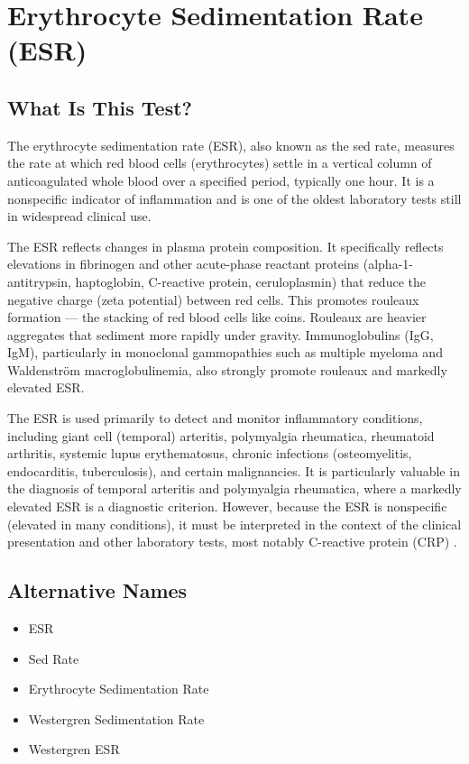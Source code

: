 \chapter{Erythrocyte Sedimentation Rate (ESR)}

\section*{What Is This Test?}
The erythrocyte sedimentation rate (ESR), also known as the sed rate, measures the rate at which red blood cells (erythrocytes) settle in a vertical column of anticoagulated whole blood over a specified period, typically one hour. It is a nonspecific indicator of inflammation and is one of the oldest laboratory tests still in widespread clinical use.

The ESR reflects changes in plasma protein composition. It specifically reflects elevations in fibrinogen and other acute-phase reactant proteins (alpha-1-antitrypsin, haptoglobin, C-reactive protein, ceruloplasmin) that reduce the negative charge (zeta potential) between red cells. This promotes rouleaux formation --- the stacking of red blood cells like coins. Rouleaux are heavier aggregates that sediment more rapidly under gravity. Immunoglobulins (IgG, IgM), particularly in monoclonal gammopathies such as multiple myeloma and Waldenstr\"{o}m macroglobulinemia, also strongly promote rouleaux and markedly elevated ESR.

The ESR is used primarily to detect and monitor inflammatory conditions, including giant cell (temporal) arteritis, polymyalgia rheumatica, rheumatoid arthritis, systemic lupus erythematosus, chronic infections (osteomyelitis, endocarditis, tuberculosis), and certain malignancies. It is particularly valuable in the diagnosis of temporal arteritis and polymyalgia rheumatica, where a markedly elevated ESR is a diagnostic criterion. However, because the ESR is nonspecific (elevated in many conditions), it must be interpreted in the context of the clinical presentation and other laboratory tests, most notably C-reactive protein (CRP) \cite{brigden1999clinical}.

\section*{Alternative Names}
\begin{itemize}
  \item ESR
  \item Sed Rate
  \item Erythrocyte Sedimentation Rate
  \item Westergren Sedimentation Rate
  \item Westergren ESR
\end{itemize}
